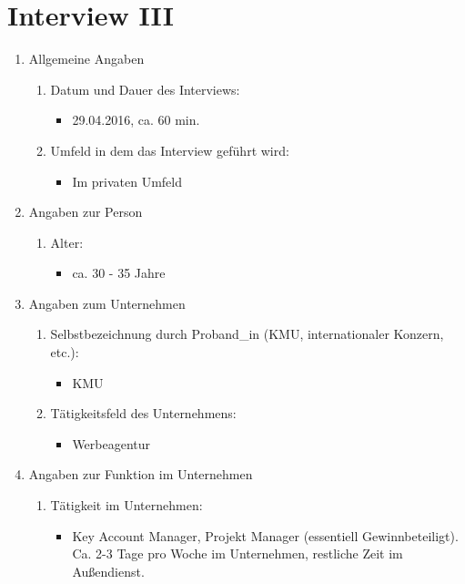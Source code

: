 \documentclass[Bachelorarbeit.tex]{subfiles}
\begin{document}
\section{Interview III}
\label{anhang:interview3}
\begin{enumerate}
	\item Allgemeine Angaben
	\begin{enumerate}
		\item Datum und Dauer des Interviews:
		\begin{itemize}
			\item[] 29.04.2016, ca. 60 min.
		\end{itemize}
		\item Umfeld in dem das Interview geführt wird:
		\begin{itemize}
			\item[] Im privaten Umfeld
		\end{itemize}
	\end{enumerate}
	\item Angaben zur Person
	\begin{enumerate}
		\item Alter:
		\begin{itemize}
			\item[] ca. 30 - 35 Jahre
		\end{itemize}
	\end{enumerate}
	\item Angaben zum Unternehmen
	\begin{enumerate}
		\item Selbstbezeichnung durch Proband\_in  (\ac{KMU}, internationaler Konzern, etc.):
		\begin{itemize}
			\item[] \ac{KMU}
		\end{itemize}
		\item Tätigkeitsfeld des Unternehmens:
		\begin{itemize}
			\item[] Werbeagentur
		\end{itemize}
	\end{enumerate}
	\item Angaben zur Funktion im Unternehmen
	\begin{enumerate}
		\item Tätigkeit im Unternehmen:
		\begin{itemize}
			\item[] Key Account Manager, Projekt Manager (essentiell Gewinnbeteiligt). Ca. 2-3 Tage pro Woche im Unternehmen, restliche Zeit im Außendienst.

\end{itemize}
\end{enumerate}
\end{enumerate}
\end{document}
